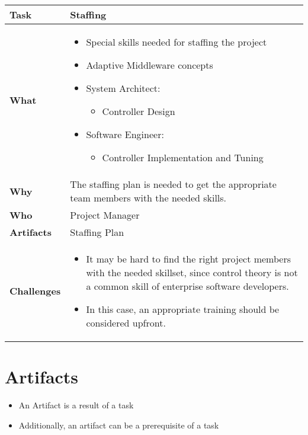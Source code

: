 \begin{tabularx}{\textwidth}{@{} l X @{}}
	\caption{Staffing} \label{table:ch6_Task_Staffing}\\
	\toprule 
	\bfseries Task & Staffing\\
	\midrule 
	\bfseries What & 
	\begin{itemize}
		\item Special skills needed for staffing the project
		\item Adaptive Middleware concepts
		\item System Architect:
		\begin{itemize}
			\item Controller Design
		\end{itemize}
		\item Software Engineer:
		\begin{itemize}
			\item Controller Implementation and Tuning
		\end{itemize}
	\end{itemize}
	\\
	\midrule 
	\bfseries Why & The staffing plan is needed to get the appropriate team members with the needed skills.\\
	\midrule 
	\bfseries Who & Project Manager\\
	\midrule 
	\bfseries Artifacts & Staffing Plan\\
	\midrule 
	\bfseries Challenges &
	\begin{itemize}
		\item It may be hard to find the right project members with the needed skillset, since control theory is not a common skill of enterprise software developers. 
		\item In this case, an appropriate training should be considered upfront.
	\end{itemize}
	\\
	\bottomrule 
\end{tabularx}


\section{Artifacts}\label{sec:ch6_artifacts}

\begin{itemize}
	\item An Artifact is a result of a task
	\item Additionally, an artifact can be a prerequisite of a task
\end{itemize}

